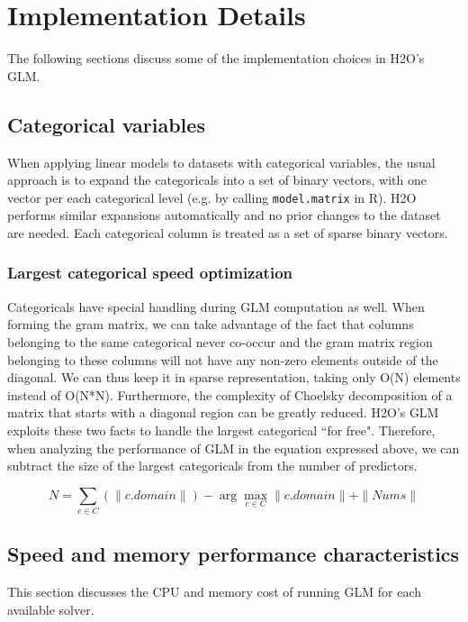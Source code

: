 \section{Implementation Details}

The following sections discuss some of the implementation choices in H2O's GLM.

\subsection{Categorical variables}

When applying linear models to datasets with categorical variables, the usual approach is to expand the
categoricals into a set of binary vectors, with one vector per each categorical level (e.g. by calling
{\texttt{model.matrix}} in R). H2O performs similar expansions automatically and no prior changes to the dataset
are needed. Each categorical column is treated as a set of sparse binary vectors.

\subsubsection{Largest categorical speed optimization}

Categoricals have special handling during GLM computation as well. When forming the gram matrix, we can take
advantage of the fact that columns belonging to the same categorical never co-occur and the gram matrix region
belonging to these columns will not have any non-zero elements outside of the diagonal. We can thus keep it in
sparse representation, taking only O(N) elements instead of O(N*N). Furthermore, the complexity of Choelsky
decomposition of a matrix that starts with a diagonal region can be greatly reduced. H2O's GLM exploits these two
facts to handle the largest categorical ``for free". Therefore, when analyzing the performance of GLM in the
equation expressed above, we can subtract the size of the largest categoricals from the number of predictors.

$$N = \sum_{c \in C} (\|c.domain\|) - \arg\max_{c \in C} \|c.domain\| + \|Nums\| $$

\subsection{Speed and memory performance characteristics}

This section discusses the CPU and memory cost of running GLM for each available solver.

